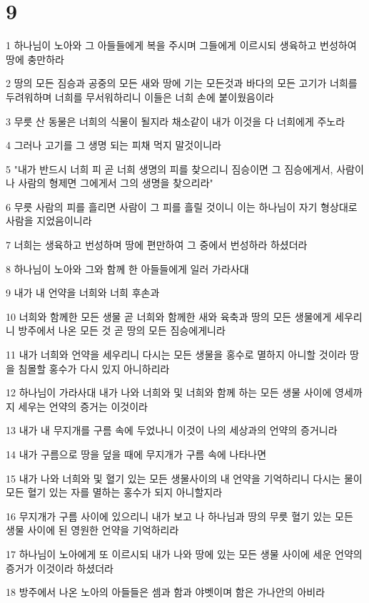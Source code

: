 \chapter{9}

\par 1 하나님이 노아와 그 아들들에게 복을 주시며 그들에게 이르시되 생육하고 번성하여 땅에 충만하라
\par 2 땅의 모든 짐승과 공중의 모든 새와 땅에 기는 모든것과 바다의 모든 고기가 너희를 두려워하며 너희를 무서워하리니 이들은 너희 손에 붙이웠음이라
\par 3 무릇 산 동물은 너희의 식물이 될지라 채소같이 내가 이것을 다 너희에게 주노라
\par 4 그러나 고기를 그 생명 되는 피채 먹지 말것이니라
\par 5 "내가 반드시 너희 피 곧 너희 생명의 피를 찾으리니 짐승이면 그 짐승에게서, 사람이나 사람의 형제면 그에게서 그의 생명을 찾으리라"
\par 6 무릇 사람의 피를 흘리면 사람이 그 피를 흘릴 것이니 이는 하나님이 자기 형상대로 사람을 지었음이니라
\par 7 너희는 생육하고 번성하며 땅에 편만하여 그 중에서 번성하라 하셨더라
\par 8 하나님이 노아와 그와 함께 한 아들들에게 일러 가라사대
\par 9 내가 내 언약을 너희와 너희 후손과
\par 10 너희와 함께한 모든 생물 곧 너희와 함께한 새와 육축과 땅의 모든 생물에게 세우리니 방주에서 나온 모든 것 곧 땅의 모든 짐승에게니라
\par 11 내가 너희와 언약을 세우리니 다시는 모든 생물을 홍수로 멸하지 아니할 것이라 땅을 침몰할 홍수가 다시 있지 아니하리라
\par 12 하나님이 가라사대 내가 나와 너희와 및 너희와 함께 하는 모든 생물 사이에 영세까지 세우는 언약의 증거는 이것이라
\par 13 내가 내 무지개를 구름 속에 두었나니 이것이 나의 세상과의 언약의 증거니라
\par 14 내가 구름으로 땅을 덮을 때에 무지개가 구름 속에 나타나면
\par 15 내가 나와 너희와 및 혈기 있는 모든 생물사이의 내 언약을 기억하리니 다시는 물이 모든 혈기 있는 자를 멸하는 홍수가 되지 아니할지라
\par 16 무지개가 구름 사이에 있으리니 내가 보고 나 하나님과 땅의 무릇 혈기 있는 모든 생물 사이에 된 영원한 언약을 기억하리라
\par 17 하나님이 노아에게 또 이르시되 내가 나와 땅에 있는 모든 생물 사이에 세운 언약의 증거가 이것이라 하셨더라
\par 18 방주에서 나온 노아의 아들들은 셈과 함과 야벳이며 함은 가나안의 아비라
